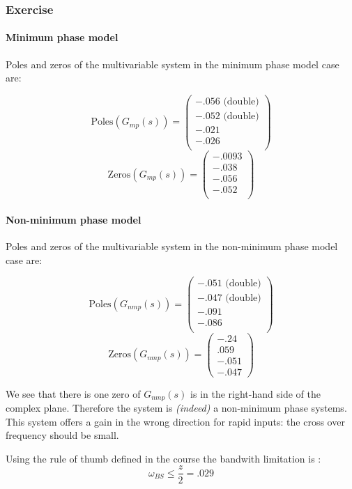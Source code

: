 \subsubsection{Exercise}

\paragraph{Minimum phase model}

Poles and zeros of the multivariable system in the minimum phase model case are:

$$
\text{Poles}(G_{mp}(s)) = 
    \left(\begin{array}{c}  
    -.056 \text{ (double)} \\
    -.052 \text{ (double)} \\
    -.021 \\
    -.026 \\
    \end{array}\right)
$$
$$
\text{Zeros}(G_{mp}(s)) = 
    \left(\begin{array}{c}
    -.0093 \\
    -.038 \\
    -.056 \\
    -.052 \\
    \end{array}\right)
$$

\paragraph{Non-minimum phase model}

Poles and zeros of the multivariable system in the non-minimum phase model case are:

$$
\text{Poles}(G_{nmp}(s)) = \left(\begin{array}{c} -.051 \text{ (double)}\\ -.047 \text{ (double)} \\-.091 \\ -.086\\ \end{array}\right)
$$
$$
\text{Zeros}(G_{nmp}(s)) = \left(\begin{array}{c} -.24\\ .059\\ -.051\\ -.047 \end{array}\right)
$$

We see that there is one zero of $G_{nmp}(s)$ is in the right-hand side of the complex plane.
Therefore the system is \emph{(indeed)} a non-minimum phase systems.
This system offers a gain in the wrong direction for rapid inputs: the cross over frequency should be small.

Using the rule of thumb defined in the course the bandwith limitation is :
$$
\omega_{BS} \leq \frac{z}{2} = .029
$$
